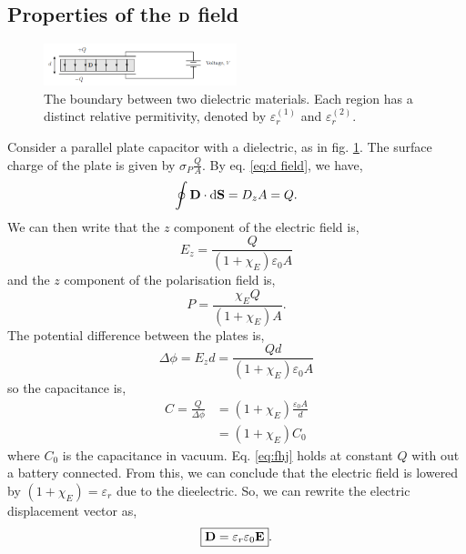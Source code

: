 \documentclass{book}
\begin{document}
\subsection{Properties of the $\vb{D}$ field}
\begin{figure}
	\centering
	\includegraphics[width=0.5\textwidth]{dielecetric capacitor.png}
	\caption{The boundary between two dielectric materials. Each region has a distinct relative permitivity, denoted by $\varepsilon^{(1)}_r$ and $\varepsilon^{(2)}_r$.}
	\label{fig:dielectric capacitor}
\end{figure}
Consider a parallel plate capacitor with a dielectric, as in fig. \ref{fig:dielectric capacitor}. The surface charge of the plate is given by $\sigma_P \frac{Q}{A}$. By eq. \eqref{eq:d field}, we have,
\begin{equation}
	\oint \vb{D}\cdot{\dd{\vb{S}}} = D_z A = Q.
\end{equation}
We can then write that the $z$ component of the electric field is,
\begin{equation}
	E_z = \frac{Q}{(1 + \chi_E)\varepsilon_0 A}
\end{equation}
and the $z$ component of the polarisation field is,
\begin{equation}
	P = \frac{\chi_E Q}{(1 + \chi_E)A}.
\end{equation}
The potential difference between the plates is,
\begin{equation}
	\Delta \phi = E_z d = \frac{Qd}{(1 + \chi_E)\varepsilon_0A}
\end{equation}
so the capacitance is,
\begin{equation}
	\begin{split}
		C = \frac{Q}{\Delta \phi} & = (1 + \chi_E)\frac{\varepsilon_0A}{d}\\
		& = (1 + \chi_E)C_0
	\end{split} \label{eq:fhj}
\end{equation}
where $C_0$ is the capacitance in vacuum. Eq. \eqref{eq:fhj} holds at constant $Q$ with out a battery connected. From this, we can conclude that the electric field is lowered by $(1 + \chi_E) = \varepsilon_r$ due to the dieelectric. So, we can rewrite the electric displacement vector as,
\begin{equation}
	\boxed{\vb{D} = \varepsilon_r\varepsilon_0\vb{E}}. \label{eq:d form}
\end{equation}
\end{document}
